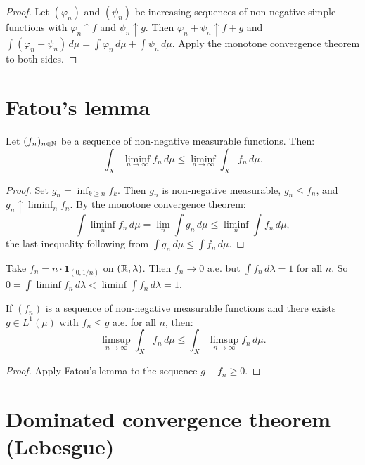 \begin{proof}
Let $(\varphi_n)$ and $(\psi_n)$ be increasing sequences of non-negative simple
functions with $\varphi_n \uparrow f$ and $\psi_n \uparrow g$. Then
$\varphi_n + \psi_n \uparrow f + g$ and
$\int (\varphi_n + \psi_n)\, d\mu = \int \varphi_n\, d\mu + \int \psi_n\, d\mu$.
Apply the monotone convergence theorem to both sides.
\end{proof}

\section{Fatou's lemma}

\begin{theorem}
\label{thm:fatou}
Let $(f_n)_{n \in \mathbb{N}}$ be a sequence of non-negative measurable functions. Then:
\[
\int_X \liminf_{n \to \infty} f_n\, d\mu \leq
\liminf_{n \to \infty} \int_X f_n\, d\mu.
\]
\end{theorem}

\begin{proof}
Set $g_n = \inf_{k \geq n} f_k$. Then $g_n$ is non-negative measurable,
$g_n \leq f_n$, and $g_n \uparrow \liminf_n f_n$. By the monotone convergence
theorem:
\[
\int \liminf_n f_n\, d\mu = \lim_n \int g_n\, d\mu \leq
\liminf_n \int f_n\, d\mu,
\]
the last inequality following from $\int g_n\, d\mu \leq \int f_n\, d\mu$.
\end{proof}

\begin{warning}[title=\textbf{The inequality can be strict}]
Take $f_n = n \cdot \mathbf{1}_{(0, 1/n)}$ on $(\mathbb{R}, \lambda)$. Then $f_n \to 0$
a.e. but $\int f_n\, d\lambda = 1$ for all $n$. So
$0 = \int \liminf f_n\, d\lambda < \liminf \int f_n\, d\lambda = 1$.
\end{warning}

\begin{corollary}
If $(f_n)$ is a sequence of non-negative measurable functions and there exists
$g \in L^1(\mu)$ with $f_n \leq g$ a.e. for all $n$, then:
\[
\limsup_{n \to \infty} \int_X f_n\, d\mu \leq
\int_X \limsup_{n \to \infty} f_n\, d\mu.
\]
\end{corollary}

\begin{proof}
Apply Fatou's lemma to the sequence $g - f_n \geq 0$.
\end{proof}

\section{Dominated convergence theorem (Lebesgue)}


